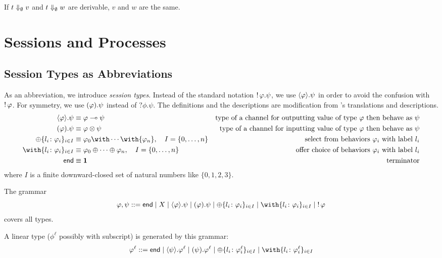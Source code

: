    \begin{corollary}
     If $t\Downarrow_\emptyset v$ and $t\Downarrow_\emptyset w$ are derivable,
     $v$ and $w$ are the same.
    \end{corollary}

    \section{Sessions and Processes}

    \subsection{Session Types as Abbreviations}

    As an abbreviation, we introduce \textit{session
    types}.
    Instead of the standard notation $\mathop{!}\varphi.\psi$, we use
    $\langle{\varphi}\rangle.{\psi}$ in order to avoid the confusion with
    $\mathop{!}\varphi$.
    For symmetry, we use $(\varphi).{\psi}$ instead of $?\phi.\psi$.
    The definitions and the descriptions are modification from
    \citet{wadler2012propositions}'s translations and descriptions.
    \begin{align*}
     \sendtype\phi\psi&\equiv \phi\limp\psi &\text{type of a channel for
     outputting value of type $\phi$ then behave as $\psi$} \\
     \recvtype\phi\psi&\equiv \phi\otimes\psi &\text{type of a channel
     for inputting value of type $\phi$ then behave as $\psi$}\\
     \oplus\{l_i\colon \phi_i\}_{i\in I} &\equiv {\phi_0}\with
     \cdots \with {\phi_n}, \quad I = \{0,\ldots,n\} & \text{select from behaviors
     $\phi_i$ with label $l_i$}\\
     \with\{l_i\colon \phi_i\}_{i\in I} &\equiv {\phi_0}\oplus
     \cdots \oplus {\phi_n}, \quad I = \{0,\ldots,n\}& \text{offer choice of
     behaviors $\phi_i$ with label $l_i$}
     \\
     \terminate &\equiv \one &\text{terminator}
    \end{align*}
    where $I$ is a finite downward-closed set of natural numbers like
    $\{0,1,2,3\}$.


    The grammar
    \[
     \phi,\psi ::= \terminate\mid X \mid \sendtype\phi\psi \mid
     \recvtype\phi\psi
     \mid \oplus\{l_i\colon\phi_i\}_{i\in I}
     \mid \with\{l_i\colon\phi_i\}_{i\in I}
     \mid \bang\phi
    \]
    covers all types.

    A linear type ($\phi^\ell$ possibly with subscript) is generated by
    this grammar:
    \[
     \phi^\ell ::= \terminate\mid
     \sendtype{\psi}{\phi^\ell} \mid
     \recvtype{\psi}{\phi^\ell}
     \mid \oplus\{l_i\colon\phi^\ell_i\}_{i\in I}
     \mid \with\{l_i\colon\phi^\ell_i\}_{i\in I}
    \]

